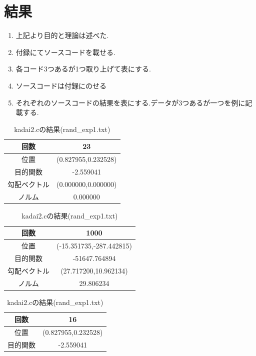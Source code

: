 \documentclass[12pt]{jarticle}
\begin{document}
\section{結果}
\begin{enumerate}
    \item 上記より目的と理論は述べた.
    \item 付録にてソースコードを載せる.
    \item 各コード3つあるが1つ取り上げて表にする.\\
    \item ソースコードは付録にのせる
    \item それぞれのソースコードの結果を表にする.データが3つあるが一つを例に記載する.
\end{enumerate}
\begin{table}[h]
    \caption{kadai1.c}
    \begin{center}
        \begin{tabular}{|c|c|}
            \hline
            回数&23\\
            \hline
            位置&(0.827955,0.232528)\\
            \hline
            目的関数&-2.559041\\
            \hline
            勾配ベクトル&(0.000000,0.000000)\\
            \hline
            ノルム&0.000000\\
            \hline
        \end{tabular}
        \caption{kadai1\_2.cの結果(data60.txt)}
        \begin{tabular}{|c|c|}
            \hline
            回数&1000\\
            \hline
            位置&(-15.351735,-287.442815)\\
            \hline
            目的関数&-51647.764894\\
            \hline
            勾配ベクトル&(27.717200,10.962134)\\
            \hline
            ノルム&29.806234\\
            \hline
        \end{tabular}
        \caption{kadai2.cの結果(rand\_exp1.txt)}
        \begin{tabular}{|c|c|}
        \hline
        回数&16\\
        \hline
        位置&(0.827955,0.232528)\\
        \hline
        目的関数&-2.559041\\
        \hline

\end{tabular}
\end{center}
\end{table}
\end{document}
